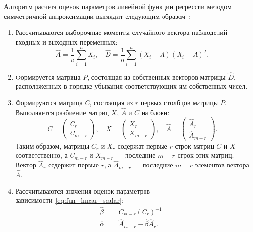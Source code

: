 Алгоритм расчета оценок параметров линейной функции регрессии
методом симметричной аппроксимации выглядит следующим образом~\cite{mukha_2016}:
\begin{enumerate}
\item Рассчитываются выборочные моменты случайного вектора наблюдений входных и выходных переменных:
  \begin{equation*}
    \hat{A} = \dfrac{1}{n} \sum_{i=1}^n X_i, \quad
    \hat{D} = \dfrac{1}{n}  \sum_{i=1}^n (X_i - A) (X_i - A)^T.
  \end{equation*}
\item Формируется матрица \( P \), состоящая из собственных векторов матрицы \( \hat{D} \),
  расположенных в порядке убывания соответствующих им собственных чисел.
\item Формируются матрица \( C \), состоящая из \( r \) первых столбцов матрицы
  \( P \). Выполняется разбиение матриц \( X \), \( \hat{A} \) и \( C \) на блоки:
  \begin{equation*}
    C =
    \begin{pmatrix}
      C_r \\
      C_{m-r}
    \end{pmatrix}, \quad
    X =
    \begin{pmatrix}
      X_r \\
      X_{m-r}
    \end{pmatrix}, \quad
    \hat{A} =
    \begin{pmatrix}
      \hat{A}_r \\
      \hat{A}_{m-r}
    \end{pmatrix}.
  \end{equation*}
  Таким образом, матрицы \( C_r \) и \( X_r \) содержат первые \( r \) строк матриц
  \( C \) и \( X \) соответственно,
  а \( C_{m-r} \) и \( X_{m-r} \) --- последние \( m - r \) строк этих матриц.
  Вектор \( \hat{A}_r \) содержит первые \( r \),
  а \( \hat{A}_{m-r} \) --- последние \( m - r \) элементов вектора \( \hat{A} \).
\item Рассчитываются значения оценок параметров зависимости~\eqref{eq:fun_linear_scalar}:
  \begin{equation*}
    \begin{aligned}
      \hat{\beta} &= C_{m-r} (C_r)^{-1}, \\
      \hat{\alpha} &= \hat{A}_{m-r} - \hat{\beta} \hat{A}_r.
    \end{aligned}
  \end{equation*}
\end{enumerate}

